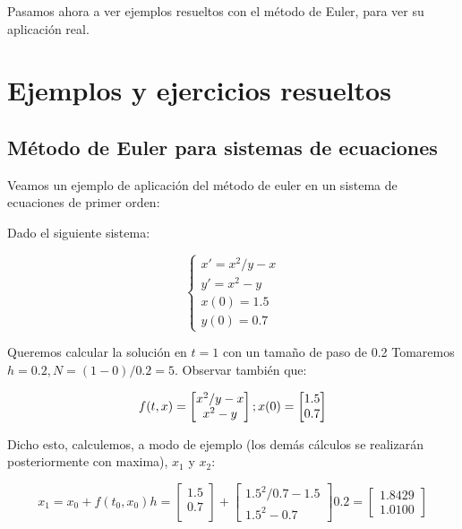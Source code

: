 \documentclass[12pt]{article}       %
\begin{document}
Pasamos ahora a ver ejemplos resueltos con el método de Euler, para ver su aplicación real.

\section{Ejemplos y ejercicios resueltos}

\subsection{Método de Euler para sistemas de ecuaciones}

Veamos un ejemplo de aplicación del método de euler en un sistema de ecuaciones de primer orden:

Dado el siguiente sistema:

$$
\begin{cases}
x' = x^2/y - x\\
y' = x^2-y \\
x(0) = 1.5\\
y(0)=0.7
\end{cases}
$$

Queremos calcular la solución en $t=1$ con un tamaño de paso de 0.2
Tomaremos $h=0.2, N=(1-0)/0.2=5$.
Observar también que:

\begin{equation*}
f(t,x)=\begin{bmatrix}
 x^2/y-x \\
 x^2-y \\
\end{bmatrix};\\
x(0)=\begin{bmatrix}
1.5 \\
0.7
\end{bmatrix}
\end{equation*}
 
Dicho esto, calculemos, a modo de ejemplo (los demás cálculos se realizarán posteriormente con maxima), $x_1$ y $x_2$:

\begin{equation*}
x_1=x_0+f(t_0,x_0)h=\begin{bmatrix}
1.5\\
0.7\\
\end{bmatrix} + \begin{bmatrix}
1.5^2/0.7 - 1.5\\
1.5^2 - 0.7
\end{bmatrix}0.2=\begin{bmatrix}
1.8429\\
1.0100
\end{bmatrix}  
\end{equation*}
\end{document}
